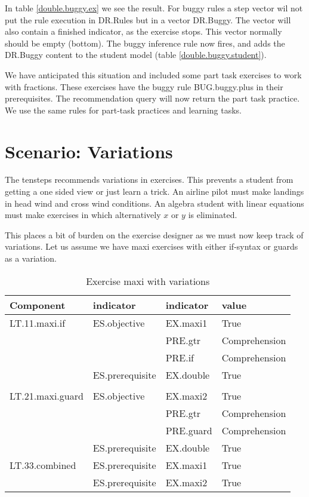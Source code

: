 In table \ref{double.buggy.ex} we see the result.
For buggy rules a step vector wil not put the rule execution in DR.Rules but in a vector DR.Buggy.
The vector will also contain a finished indicator, as the exercise stops.
This vector normally should be empty (bottom). 
The buggy inference rule now fires, and adds the DR.Buggy content to the student model (table \ref{double.buggy.student}).

We have anticipated this situation and included some part task exercises to work with fractions.
These exercises have the buggy rule BUG.buggy.plus in their prerequisites.
The recommendation query will now return the part task practice.
We use the same rules for part-task practices and learning tasks. 










\section{Scenario: Variations}
\label{sec:variat}

The \gls{tensteps} recommends variations in exercises.
This prevents a student from getting a one sided view or just learn a trick.
An airline pilot must make landings in head wind and cross wind conditions.
An algebra student with linear equations must make exercises in which alternatively $x$ or $y$ is eliminated.

This places a bit of burden on the exercise designer as we must now keep track of variations.
Let us assume we have maxi exercises with either if-syntax or guards as  a variation.

\begin{table}[H]
\begin{tabular}{| l | l | l | l |}
\hline
Component & indicator & indicator & value\\
\hline
LT.11.maxi.if & ES.objective &EX.maxi1 & True\\
 & & PRE.gtr &Comprehension\\
 & & PRE.if &Comprehension\\
 & ES.prerequisite & EX.double & True\\
 & & & \\
LT.21.maxi.guard & ES.objective &EX.maxi2 & True\\
 & & PRE.gtr &Comprehension\\
 & & PRE.guard &Comprehension\\
 & ES.prerequisite & EX.double & True\\
\hline
LT.33.combined & ES.prerequisite  &EX.maxi1 & True\\
 & ES.prerequisite &EX.maxi2 & True\\

\hline
\end{tabular}
\caption{Exercise maxi with variations}
\label{tab:variations}
\end{table}

